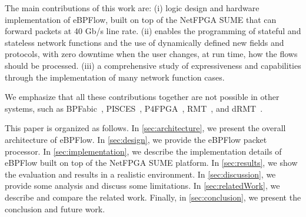 The main contributions of this work are: 
(i) logic design and hardware implementation of eBPFlow, built on top of the NetFPGA SUME that can forward packets at 40 Gb/s line rate.
(ii) \system enables the programming of stateful and stateless network functions and the use of dynamically defined new fields and protocols, with zero downtime when the user changes, at run time, how the flows should be processed.
(iii) a comprehensive study of \system expressiveness and capabilities through the implementation of many network function cases.

We emphasize that all these contributions together are not possible in other systems, such as BPFabic~\cite{Jouet:2017:BPFabric}, PISCES~\cite{Shahbaz:2016:Pisces}, P4FPGA~\cite{p4fpga}, RMT~\cite{bosshart2013forwarding}, and dRMT~\cite{chole2017drmt}. 

This paper is organized as follows. In \textsection\ref{sec:architecture}, we present the overall architecture of eBPFlow. In \textsection\ref{sec:design}, we provide the eBPFlow packet processor. In \textsection\ref{sec:implementation}, we describe the implementation details of eBPFlow built on top of the NetFPGA SUME platform. In \textsection\ref{sec:results}, we show the evaluation and results in a realistic environment. 
In \textsection\ref{sec:discussion}, we provide some analysis and discuss some limitations.
In \textsection\ref{sec:relatedWork}, we describe and compare the related work. Finally, in \textsection\ref{sec:conclusion}, we present the conclusion and future work.
